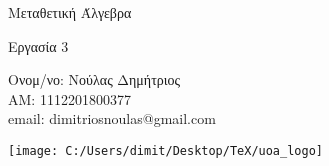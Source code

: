 \documentclass[oneside,a4paper]{article}
\newcommand {\tl}{\textlatin}
\begin{document}
	
	
	\begin{framed}	
		\begin{center}
			\huge Μεταθετική Άλγεβρα
		\end{center}
		\begin{center}
			\huge Εργασία 3
		\end{center}
		\vspace{0.3truecm}
		\begin{center}
			Ονομ/νο: Νούλας Δημήτριος\\
			ΑΜ: 1112201800377\\
			\tl{email}: \tl{dimitriosnoulas@gmail.com}
		\end{center}
		\vspace{0.3truecm}
	\end{framed}
	\vspace*{\fill}
	\begin{center}
	\texttt{[image: C:/Users/dimit/Desktop/TeX/uoa\_logo]}
	\end{center}
\vspace{1cm}
\pagebreak
\end{document}
